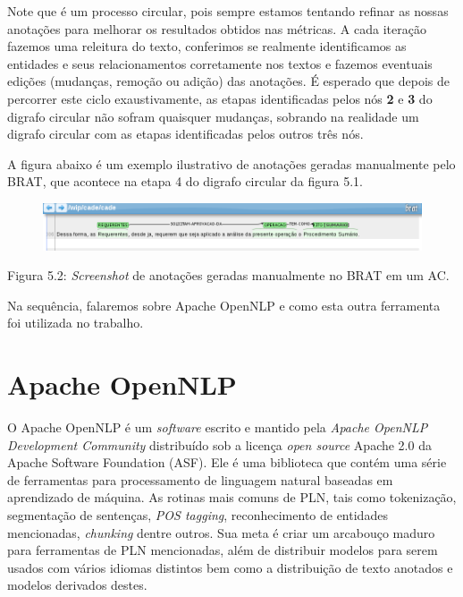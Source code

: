 \documentclass[11pt]{report}
\begin{document}
Note que é um processo circular, pois sempre estamos tentando refinar as nossas anotações para melhorar os resultados obtidos nas métricas. A cada iteração
fazemos uma releitura do texto, conferimos se realmente identificamos as entidades e seus relacionamentos corretamente nos textos e fazemos eventuais edições
(mudanças, remoção ou adição) das anotações. É esperado que depois de percorrer este ciclo exaustivamente, as etapas identificadas pelos nós \textbf{2} e \textbf{3}
do digrafo circular não sofram quaisquer mudanças, sobrando na realidade um digrafo circular com as etapas identificadas pelos outros três nós.

A figura abaixo é um exemplo ilustrativo de anotações geradas manualmente pelo BRAT, que acontece na etapa 4 do digrafo circular da figura 5.1.
\begin{figure}[h!]
  \hspace*{-1.8cm}
  \includegraphics[scale=0.59]{brat}
\end{figure}

\begin{center}
  Figura 5.2: \textit{Screenshot} de anotações geradas manualmente no BRAT em um AC.
\end{center}

Na sequência, falaremos sobre Apache OpenNLP e como esta outra ferramenta foi utilizada no trabalho.

\section{Apache OpenNLP}

\indent\indent O Apache OpenNLP é um \textit{software} escrito e mantido pela \textit{Apache OpenNLP Development Community} distribuído sob a licença \textit{open source}
Apache 2.0 da Apache Software Foundation (ASF). Ele é uma biblioteca que contém uma série de ferramentas para processamento de linguagem natural baseadas em aprendizado
de máquina. As rotinas mais comuns de PLN, tais como tokenização, segmentação de sentenças, \textit{POS tagging}, reconhecimento de entidades mencionadas, \textit{chunking}
dentre outros. Sua meta é criar um arcabouço maduro para ferramentas de PLN mencionadas, além de distribuir modelos para serem usados com vários idiomas distintos bem como
a distribuição de texto anotados e modelos derivados destes.
\end{document}
